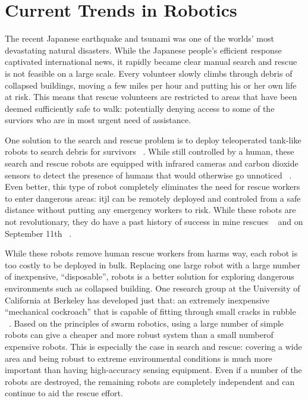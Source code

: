 \documentclass[twocolumn,11pt]{article}
\begin{document}
\section{Current Trends in Robotics}
\label{sec:econ}
The recent Japanese earthquake and tsunami was one of the worlds' most
devastating natural disasters. While the Japanese people's efficient response
captivated international news, it rapidly became clear manual search and rescue
is not feasible on a large scale. Every volunteer slowly climbs through debris
of collapsed buildings, moving a few miles per hour and putting his or her own
life at risk. This means that rescue volunteers are restricted to areas that
have been deemed sufficiently safe to walk: potentially denying access to some
of the surviors who are in most urgent need of assistance.

One solution to the search and rescue problem is to deploy teleoperated
tank-like robots to search debris for survivors ~\cite{search}. While still
controlled by a human, these search and rescue robots are equipped with
infrared cameras and carbon dioxide sensors to detect the presence of humans
that would otherwise go unnoticed ~\cite{search}. Even better,
this type of robot completely eliminates the need for rescue workers to enter
dangerous areas: itjl can be remotely deployed and controled from a safe
distance without putting any emergency workers to risk. While these robots are
not revolutionary, they do have a past history of success in mine rescues
~\cite{mine} and on September 11th ~\cite{sept11}.

While these robots remove human rescue workers from harms way, each robot is
too costly to be deployed in bulk. Replacing one large robot with a large
number of inexpensive, ``disposable'', robots is a better solution for
exploring dangerous environments such as collapsed building. One research group
at the University of California at Berkeley has developed just that: an
extremely inexpensive ``mechanical cockroach'' that is capable of fitting
through small cracks in rubble ~\cite{cockroach}. Based on the principles of
swarm robotics, using a large number of simple robots can give a cheaper and
more robust system than a small numberof expensive robots. This is especially
the case in search and rescue: covering a wide area and being robust to extreme
environmental conditions is much more important than having high-accuracy
sensing equipment. Even if a number of the robots are destroyed, the remaining
robots are completely independent and can continue to aid the rescue effort.
\end{document}
